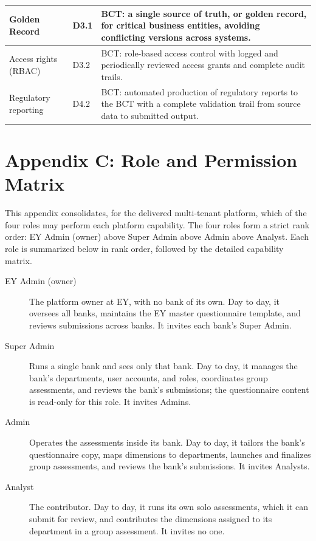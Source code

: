 {\begin{longtable}{|p{3.4cm}|p{1.3cm}|p{9.6cm}|}
\hline
Golden Record & D3.1 & BCT: a single source of truth, or golden record, for critical business entities, avoiding conflicting versions across systems. \\
\hline
Access rights (RBAC) & D3.2 & BCT: role-based access control with logged and periodically reviewed access grants and complete audit trails. \\
\hline
Regulatory reporting & D4.2 & BCT: automated production of regulatory reports to the BCT with a complete validation trail from source data to submitted output. \\
\hline
\end{longtable}
}

\clearpage
{}
\section*{Appendix C: Role and Permission Matrix}

This appendix consolidates, for the delivered multi-tenant platform, which of the four roles may perform each platform capability. The four roles form a strict rank order: EY Admin (owner) above Super Admin above Admin above Analyst. Each role is summarized below in rank order, followed by the detailed capability matrix.

\begin{description}
\item[EY Admin (owner)] The platform owner at EY, with no bank of its own. Day to day, it oversees all banks, maintains the EY master questionnaire template, and reviews submissions across banks. It invites each bank's Super Admin.
\item[Super Admin] Runs a single bank and sees only that bank. Day to day, it manages the bank's departments, user accounts, and roles, coordinates group assessments, and reviews the bank's submissions; the questionnaire content is read-only for this role. It invites Admins.
\item[Admin] Operates the assessments inside its bank. Day to day, it tailors the bank's questionnaire copy, maps dimensions to departments, launches and finalizes group assessments, and reviews the bank's submissions. It invites Analysts.
\item[Analyst] The contributor. Day to day, it runs its own solo assessments, which it can submit for review, and contributes the dimensions assigned to its department in a group assessment. It invites no one.
\end{description}

